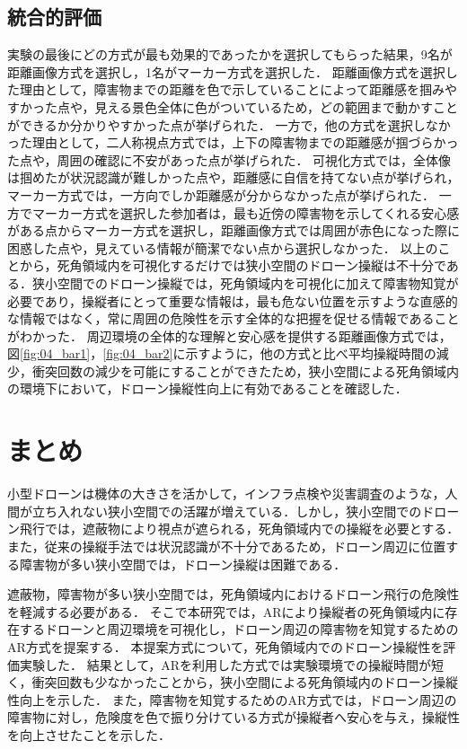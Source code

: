 \documentclass[submit]{ipsj}
\begin{document}
\subsection{統合的評価}
実験の最後にどの方式が最も効果的であったかを選択してもらった結果，9名が距離画像方式を選択し，1名がマーカー方式を選択した．
距離画像方式を選択した理由として，障害物までの距離を色で示していることによって距離感を掴みやすかった点や，見える景色全体に色がついているため，どの範囲まで動かすことができるか分かりやすかった点が挙げられた．
一方で，他の方式を選択しなかった理由として，二人称視点方式では，上下の障害物までの距離感が掴づらかった点や，周囲の確認に不安があった点が挙げられた．
可視化方式では，全体像は掴めたが状況認識が難しかった点や，距離感に自信を持てない点が挙げられ，マーカー方式では，一方向でしか距離感が分からなかった点が挙げられた．
一方でマーカー方式を選択した参加者は，最も近傍の障害物を示してくれる安心感がある点からマーカー方式を選択し，距離画像方式では周囲が赤色になった際に困惑した点や，見えている情報が簡潔でない点から選択しなかった．
以上のことから，死角領域内を可視化するだけでは狭小空間のドローン操縦は不十分である．狭小空間でのドローン操縦では，死角領域内を可視化に加えて障害物知覚が必要であり，操縦者にとって重要な情報は，最も危ない位置を示すような直感的な情報ではなく，常に周囲の危険性を示す全体的な把握を促せる情報であることがわかった．
周辺環境の全体的な理解と安心感を提供する距離画像方式では，図\ref{fig:04_bar1}，\ref{fig:04_bar2}に示すように，他の方式と比べ平均操縦時間の減少，衝突回数の減少を可能にすることができたため，狭小空間による死角領域内の環境下において，ドローン操縦性向上に有効であることを確認した．

\section{まとめ}
\label{sec:Conclusion}
小型ドローンは機体の大きさを活かして，インフラ点検や災害調査のような，人間が立ち入れない狭小空間での活躍が増えている．しかし，狭小空間でのドローン飛行では，遮蔽物により視点が遮られる，死角領域内での操縦を必要とする．また，従来の操縦手法では状況認識が不十分であるため，ドローン周辺に位置する障害物が多い狭小空間では，ドローン操縦は困難である．\par
遮蔽物，障害物が多い狭小空間では，死角領域内におけるドローン飛行の危険性を軽減する必要がある．
そこで本研究では，ARにより操縦者の死角領域内に存在するドローンと周辺環境を可視化し，ドローン周辺の障害物を知覚するためのAR方式を提案する．
本提案方式について，死角領域内でのドローン操縦性を評価実験した．
結果として，ARを利用した方式では実験環境での操縦時間が短く，衝突回数も少なかったことから，狭小空間による死角領域内のドローン操縦性向上を示した．
また，障害物を知覚するためのAR方式では，ドローン周辺の障害物に対し，危険度を色で振り分けている方式が操縦者へ安心を与え，操縦性を向上させたことを示した．
\end{document}
